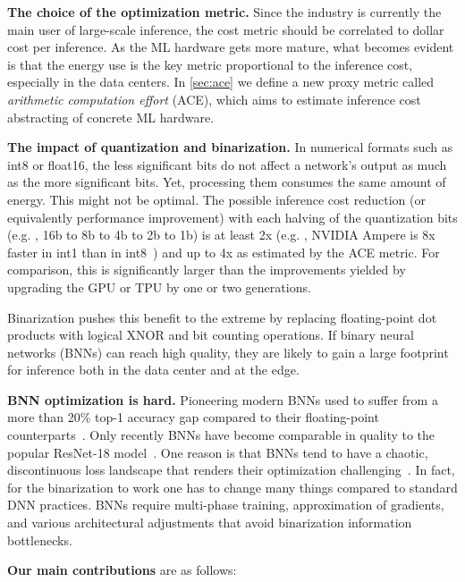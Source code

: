 \textbf{The choice of the optimization metric.} Since the industry is currently the main user of large-scale inference, the cost metric should be correlated to dollar cost per inference. As the ML hardware gets more mature, what becomes evident is that the energy use is the key metric proportional to the inference cost, especially in the data centers. In \ref{sec:ace} we define a new proxy metric called \emph{arithmetic computation effort} (ACE), which aims to estimate inference cost abstracting of concrete ML hardware.

\textbf{The impact of quantization and binarization.} In numerical formats such as int8 or float16, the less significant bits do not affect a network's output as much as the more significant bits. Yet, processing them consumes the same amount of energy. This might not be optimal. The possible inference cost reduction (or equivalently performance improvement) with each halving of the quantization bits (e.g. , 16b to 8b to 4b to 2b to 1b) is at least 2x (e.g. , NVIDIA Ampere is 8x faster in int1 than in int8~\cite{nvidia2020ampere}) and up to 4x as estimated by the ACE metric. For comparison, this is significantly larger than the improvements yielded by upgrading the GPU or TPU by one or two generations. 

Binarization pushes this benefit to the extreme by replacing floating-point dot products with logical XNOR and bit counting operations. If binary neural networks (BNNs) can reach high quality, they are likely to gain a large footprint for inference both in the data center and at the edge.

\textbf{BNN optimization is hard.} Pioneering modern BNNs used to suffer from a more than 20\% top-1 accuracy gap compared to their floating-point counterparts~\cite{hubara2016bnn}. Only recently BNNs have become comparable in quality to the popular ResNet-18 model~\cite{Liu2020reactnet, liu2021adambnn}. One reason is that BNNs tend to have a chaotic, discontinuous loss landscape that renders their optimization challenging~\cite{li2017trainquantized, liu2021adambnn}. In fact, for the binarization to work one has to change many things compared to standard DNN practices. BNNs require multi-phase training, approximation of gradients, and various architectural adjustments that avoid binarization information bottlenecks.

 \textbf{Our main contributions} are as follows:

